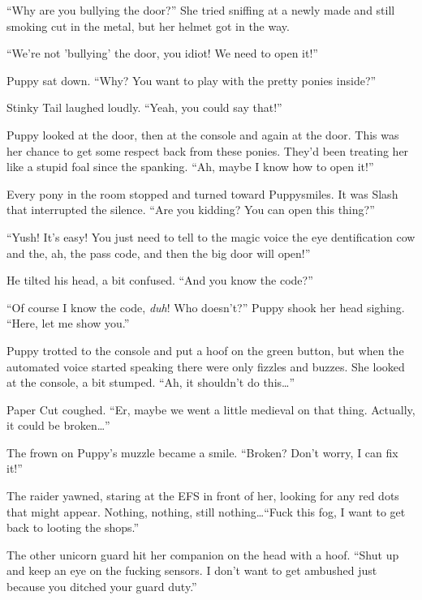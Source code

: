 ``Why are you bullying the door?'' She tried sniffing at a newly made and still smoking cut in the metal, but her helmet got in the way.

``We're not 'bullying' the door, you idiot! We need to open it!''

Puppy sat down. ``Why? You want to play with the pretty ponies inside?''

Stinky Tail laughed loudly. ``Yeah, you could say that!''

Puppy looked at the door, then at the console and again at the door. This was her chance to get some respect back from these ponies. They'd been treating her like a stupid foal since the spanking. ``Ah, maybe I know how to open it!''

Every pony in the room stopped and turned toward Puppysmiles. It was Slash that interrupted the silence. ``Are you kidding? You can open this thing?''

``Yush! It's easy! You just need to tell to the magic voice the eye dentification cow and the, ah, the pass code, and then the big door will open!''

He tilted his head, a bit confused. ``And you know the code?''

``Of course I know the code, \emph{duh}\/! Who doesn't?'' Puppy shook her head sighing. ``Here, let me show you.''

Puppy trotted to the console and put a hoof on the green button, but when the automated voice started speaking there were only fizzles and buzzes. She looked at the console, a bit stumped. ``Ah, it shouldn't do this\dots''

Paper Cut coughed. ``Er, maybe we went a little medieval on that thing. Actually, it could be broken\dots''

The frown on Puppy's muzzle became a smile. ``Broken? Don't worry, I can fix it!''



\horizonline


The raider yawned, staring at the EFS in front of her, looking for any red dots that might appear. Nothing, nothing, still nothing\dots ``Fuck this fog, I want to get back to looting the shops.''

The other unicorn guard hit her companion on the head with a hoof. ``Shut up and keep an eye on the fucking sensors. I don't want to get ambushed just because you ditched your guard duty.''

